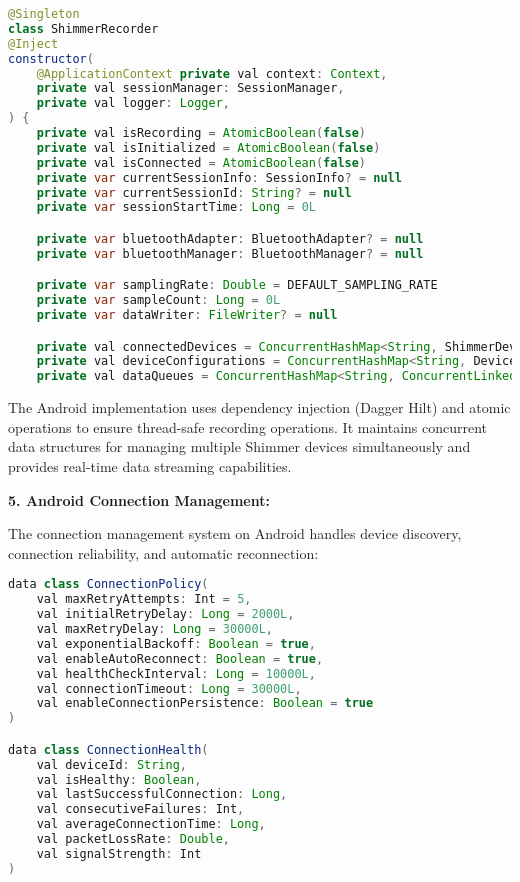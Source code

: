 {{{\begin{lstlisting}[language=Java]
@Singleton
class ShimmerRecorder
@Inject
constructor(
    @ApplicationContext private val context: Context,
    private val sessionManager: SessionManager,
    private val logger: Logger,
) {
    private val isRecording = AtomicBoolean(false)
    private val isInitialized = AtomicBoolean(false)
    private val isConnected = AtomicBoolean(false)
    private var currentSessionInfo: SessionInfo? = null
    private var currentSessionId: String? = null
    private var sessionStartTime: Long = 0L

    private var bluetoothAdapter: BluetoothAdapter? = null
    private var bluetoothManager: BluetoothManager? = null

    private var samplingRate: Double = DEFAULT_SAMPLING_RATE
    private var sampleCount: Long = 0L
    private var dataWriter: FileWriter? = null

    private val connectedDevices = ConcurrentHashMap<String, ShimmerDevice>()
    private val deviceConfigurations = ConcurrentHashMap<String, DeviceConfiguration>()
    private val dataQueues = ConcurrentHashMap<String, ConcurrentLinkedQueue<SensorSample>>()
\end{lstlisting}

The Android implementation uses dependency injection (Dagger Hilt) and atomic operations 
to ensure thread-safe recording operations. It maintains concurrent data structures for 
managing multiple Shimmer devices simultaneously and provides real-time data streaming 
capabilities.

\textbf{5. Android Connection Management:}

The connection management system on Android handles device discovery, connection 
reliability, and automatic reconnection:

\begin{lstlisting}[language=Java]
data class ConnectionPolicy(
    val maxRetryAttempts: Int = 5,
    val initialRetryDelay: Long = 2000L,
    val maxRetryDelay: Long = 30000L,
    val exponentialBackoff: Boolean = true,
    val enableAutoReconnect: Boolean = true,
    val healthCheckInterval: Long = 10000L,
    val connectionTimeout: Long = 30000L,
    val enableConnectionPersistence: Boolean = true
)

data class ConnectionHealth(
    val deviceId: String,
    val isHealthy: Boolean,
    val lastSuccessfulConnection: Long,
    val consecutiveFailures: Int,
    val averageConnectionTime: Long,
    val packetLossRate: Double,
    val signalStrength: Int
)
\end{lstlisting}

}}}
